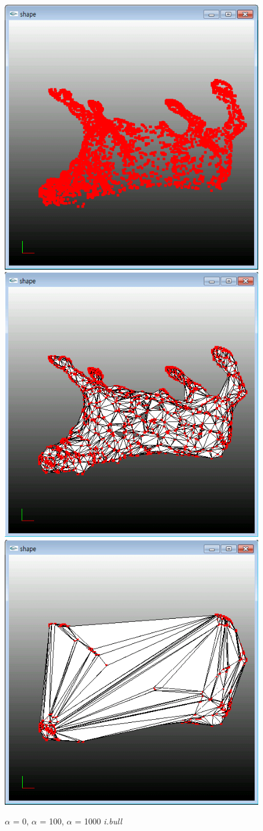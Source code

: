 \documentclass[11pt]{article}
\begin{document}
\begin{figure}[ht]
\includegraphics[width=.5\textwidth]{FIGS/alpha0-ibull}
\hspace{1cm}
\includegraphics[width=.5\textwidth]{FIGS/alpha100-ibull}
\vspace{1cm}
\includegraphics[width=.5\textwidth]{FIGS/alpha1000-ibull}
\caption{$\alpha$ = 0, $\alpha$ = 100, $\alpha$ = 1000 \textit{i.bull}}
\end{figure}
\end{document}
